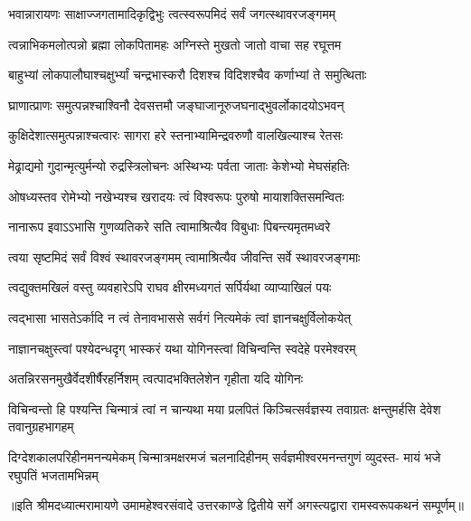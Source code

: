 

\addtocounter{shlokacount}{62}

\twolineshloka
{भवान्नारायणः साक्षाज्जगतामादिकृद्विभुः}
{त्वत्स्वरूपमिदं सर्वं जगत्स्थावरजङ्गमम्} %

\twolineshloka
{त्वन्नाभिकमलोत्पन्नो ब्रह्मा लोकपितामहः}
{अग्निस्ते मुखतो जातो वाचा सह रघूत्तम} %

\twolineshloka
{बाहुभ्यां लोकपालौघाश्चक्षुर्भ्यां चन्द्रभास्करौ}
{दिशश्च विदिशश्चैव कर्णाभ्यां ते समुत्थिताः} %

\twolineshloka
{घ्राणात्प्राणः समुत्पन्नश्चाश्विनौ देवसत्तमौ}
{जङ्घाजानूरुजघनाद्भुवर्लोकादयोऽभवन्} %

\twolineshloka
{कुक्षिदेशात्समुत्पन्नाश्चत्वारः सागरा हरे}
{स्तनाभ्यामिन्द्रवरुणौ वालखिल्याश्च रेतसः} %

\twolineshloka
{मेढ्राद्यमो गुदान्मृत्युर्मन्यो रुद्रस्त्रिलोचनः}
{अस्थिभ्यः पर्वता जाताः केशेभ्यो मेघसंहतिः} %

\twolineshloka
{ओषध्यस्तव रोमेभ्यो नखेभ्यश्च खरादयः}
{त्वं विश्वरूपः पुरुषो मायाशक्तिसमन्वितः} %

\twolineshloka
{नानारूप इवाऽऽभासि गुणव्यतिकरे सति}
{त्वामाश्रित्यैव विबुधाः पिबन्त्यमृतमध्वरे} %

\twolineshloka
{त्वया सृष्टमिदं सर्वं विश्वं स्थावरजङ्गमम्}
{त्वामाश्रित्यैव जीवन्ति सर्वे स्थावरजङ्गमाः} %

\twolineshloka
{त्वद्युक्तमखिलं वस्तु व्यवहारेऽपि राघव}
{क्षीरमध्यगतं सर्पिर्यथा व्याप्याखिलं पयः} %

\twolineshloka
{त्वद्भासा भासतेऽर्कादि न त्वं तेनावभाससे}
{सर्वगं नित्यमेकं त्वां ज्ञानचक्षुर्विलोकयेत्} %

\twolineshloka
{नाज्ञानचक्षुस्त्वां पश्येदन्धदृग् भास्करं यथा}
{योगिनस्त्वां विचिन्वन्ति स्वदेहे परमेश्वरम्} %

\twolineshloka
{अतन्निरसनमुखैर्वेदशीर्षैरहर्निशम्}
{त्वत्पादभक्तिलेशेन गृहीता यदि योगिनः} %

\threelineshloka
{विचिन्वन्तो हि पश्यन्ति चिन्मात्रं त्वां न चान्यथा}
{मया प्रलपितं किञ्चित्सर्वज्ञस्य तवाग्रतः}
{क्षन्तुमर्हसि देवेश तवानुग्रहभागहम्} %

\fourlineindentedshloka
{दिग्देशकालपरिहीनमनन्यमेकम्}
{चिन्मात्रमक्षरमजं चलनादिहीनम्}
{सर्वज्ञमीश्वरमनन्तगुणं व्युदस्त-}
{मायं भजे रघुपतिं भजतामभिन्नम्} %


{॥इति श्रीमदध्यात्मरामायणे उमामहेश्वरसंवादे उत्तरकाण्डे द्वितीये  सर्गे 
अगस्त्यद्वारा  रामस्वरूपकथनं सम्पूर्णम्॥}
